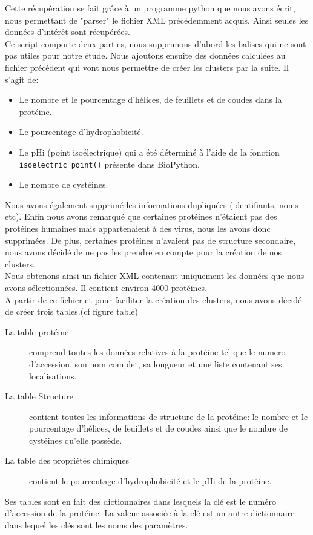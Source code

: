Cette récupération se fait grâce à un programme python que nous avons écrit, nous permettant de "parser" le fichier XML précédemment acquis. Ainsi seules les données d'intérêt sont récupérées.\\

Ce script comporte deux parties, nous supprimons d'abord les balises qui ne sont pas utiles pour notre étude.
Nous ajoutons ensuite des données calculées au fichier précédent qui vont nous permettre de créer les clusters par la suite. Il s'agit de:
\begin{itemize}
\item Le nombre et le pourcentage d'hélices, de feuillets et de coudes dans la protéine.
\item Le pourcentage d'hydrophobicité.
\item Le pHi (point isoélectrique) qui a été déterminé à l'aide de la fonction\\ \texttt{isoelectric\_point()} présente dans BioPython.
\item Le nombre de cystéines.
\end{itemize}

Nous avons également supprimé les informations dupliquées (identifiants, noms etc).
Enfin nous avons remarqué que certaines protéines n'étaient pas des protéines humaines mais appartenaient à des virus, nous les avons donc supprimées. De plus, certaines protéines n'avaient pas de structure secondaire, nous avons décidé de ne pas les prendre en compte pour la création de nos clusters.\\
\newline
Nous obtenons ainsi un fichier XML contenant uniquement les données que nous avons sélectionnées. Il contient environ 4000 protéines.\\

A partir de ce fichier et pour faciliter la création des clusters, nous avons décidé de créer trois tables.(cf figure table)
\begin{description}
\item[La table protéine] comprend toutes les données relatives à la protéine tel que le numero d'accession, son nom complet, sa longueur et une liste contenant ses localisations.
\item[La table Structure] contient toutes les informations de structure de la protéine: le nombre et le pourcentage d'hélices, de feuillets et de coudes ainsi que le nombre de cystéines qu'elle possède.
\item[La table des propriétés chimiques] contient le pourcentage d'hydrophobicité et le pHi de la protéine.
\end{description}
Ses tables sont en fait des dictionnaires dans lesquels la clé est le numéro d'accession de la protéine. La valeur associée à la clé est un autre dictionnaire dans lequel les clés sont les noms des paramètres.


